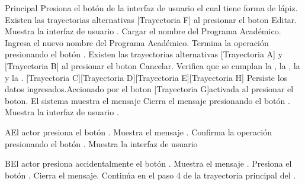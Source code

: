 \begin{UCtrayectoria}{Principal}
    \UCpaso[\UCactor] Presiona el botón  de la interfaz de usuario  el cual tiene forma de lápiz. Existen las trayectorias alternativas [Trayectoria F] al presionar el boton Editar.
    \UCpaso Muestra la interfaz de usuario .
    \UCpaso Cargar el nombre del Programa Académico.
    \UCpaso[\UCactor] Ingresa el nuevo nombre del Programa Académico.
    \UCpaso[\UCactor] Termina la operación presionando el botón . Existen las trayectorias alternativas [Trayectoria A] y [Trayectoria B] al presionar el boton Cancelar.
    \UCpaso Verifica que se cumplan la , la , la  y la . [Trayectoria C][Trayectoria D][Trayectoria E][Trayectoria H]
    \UCpaso Persiste los datos ingresados.Accionado por el boton  [Trayectoria G]activada al presionar el boton.
    \UCpaso El sistema muestra el mensaje 
    \UCpaso[\UCactor] Cierra el mensaje presionando el botón .
    \UCpaso Muestra la interfaz de usuario .
\end{UCtrayectoria}
\begin{UCtrayectoriaA}{A}{El actor presiona el botón .}
    \UCpaso Muestra el mensaje .
    \UCpaso[\UCactor] Confirma la operación presionando el botón .
    \UCpaso Muestra la interfaz de usuario 
\end{UCtrayectoriaA}
\begin{UCtrayectoriaA}{B}{El actor presiona accidentalmente el botón .}
    \UCpaso Muestra el mensaje .
    \UCpaso[\UCactor] Presiona el botón .
    \UCpaso Cierra el mensaje.
    \UCpaso Continúa en el paso 4 de la trayectoria principal del .
\end{UCtrayectoriaA}
